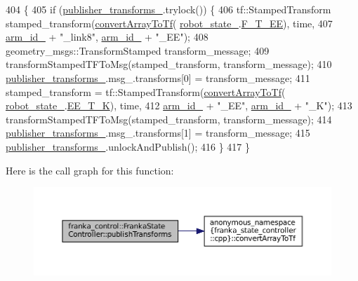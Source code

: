 \begin{DoxyCode}
404                                                                  \{
405   \textcolor{keywordflow}{if} (\hyperlink{classfranka__control_1_1FrankaStateController_a3466cae3276a7576686661ecbe05a649}{publisher\_transforms\_}.trylock()) \{
406     tf::StampedTransform stamped\_transform(\hyperlink{namespaceanonymous__namespace_02franka__state__controller_8cpp_03_aca5abe1f63ce51c9ac407aa423c9a0cf}{convertArrayToTf}(
      \hyperlink{classfranka__control_1_1FrankaStateController_a0d097abb2665aadbc8d38662bba5ae8b}{robot\_state\_}.\hyperlink{structfranka_1_1RobotState_a705b85049fef747008b0eba8284c8057}{F\_T\_EE}), time,
407                                            \hyperlink{classfranka__control_1_1FrankaStateController_a603d865facc13c7b1f2ebb5a27404221}{arm\_id\_} + \textcolor{stringliteral}{"\_link8"}, \hyperlink{classfranka__control_1_1FrankaStateController_a603d865facc13c7b1f2ebb5a27404221}{arm\_id\_} + \textcolor{stringliteral}{"\_EE"});
408     geometry\_msgs::TransformStamped transform\_message;
409     transformStampedTFToMsg(stamped\_transform, transform\_message);
410     \hyperlink{classfranka__control_1_1FrankaStateController_a3466cae3276a7576686661ecbe05a649}{publisher\_transforms\_}.msg\_.transforms[0] = transform\_message;
411     stamped\_transform = tf::StampedTransform(\hyperlink{namespaceanonymous__namespace_02franka__state__controller_8cpp_03_aca5abe1f63ce51c9ac407aa423c9a0cf}{convertArrayToTf}(
      \hyperlink{classfranka__control_1_1FrankaStateController_a0d097abb2665aadbc8d38662bba5ae8b}{robot\_state\_}.\hyperlink{structfranka_1_1RobotState_aeb78a3b4b76d4f57b9898cbea3a0f7aa}{EE\_T\_K}), time,
412                                              \hyperlink{classfranka__control_1_1FrankaStateController_a603d865facc13c7b1f2ebb5a27404221}{arm\_id\_} + \textcolor{stringliteral}{"\_EE"}, \hyperlink{classfranka__control_1_1FrankaStateController_a603d865facc13c7b1f2ebb5a27404221}{arm\_id\_} + \textcolor{stringliteral}{"\_K"});
413     transformStampedTFToMsg(stamped\_transform, transform\_message);
414     \hyperlink{classfranka__control_1_1FrankaStateController_a3466cae3276a7576686661ecbe05a649}{publisher\_transforms\_}.msg\_.transforms[1] = transform\_message;
415     \hyperlink{classfranka__control_1_1FrankaStateController_a3466cae3276a7576686661ecbe05a649}{publisher\_transforms\_}.unlockAndPublish();
416   \}
417 \}
\end{DoxyCode}
Here is the call graph for this function\+:
\nopagebreak
\begin{figure}[H]
\begin{center}
\leavevmode
\includegraphics[width=350pt]{classfranka__control_1_1FrankaStateController_abcab70ff196a1751f625bc14a789ca82_cgraph}
\end{center}
\end{figure}
